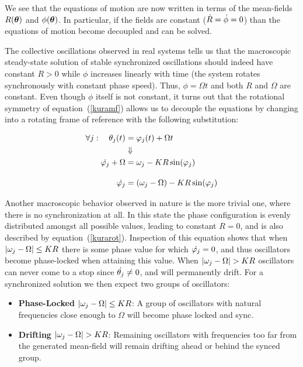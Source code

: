 We see that the equations of motion are now written in terms of the mean-fields $R(\bm{\theta})$ and $\phi(\bm{\theta})$. In
particular, if the fields are constant ($\dot{R} = \dot{\phi}=0$) than the equations of motion become decoupled and can be solved.

The collective oscillations observed in real systems tells us that the macroscopic steady-state solution of stable synchronized
oscillations should indeed have constant $R>0$ while $\phi$ increases linearly with time (the system rotates synchronously with
constant phase speed).  Thus, $\phi=\Omega t$ and both $R$ and $\Omega$ are constant. Even though $\phi$ itself is not constant, it
turns out that the rotational symmetry of equation~(\ref{kuramf}) allows us to decouple the equations by changing into a rotating frame
of reference with the following substitution:

\begin{align}
    \forall j: \quad \theta_j(t) &= \varphi_j(t) + \Omega t \notag\\
    &\Downarrow \notag\\
    \dot{\varphi_j} + \Omega &= \omega_j - K R \sin ( \varphi_j ) \notag\\[10pt]
    \dot{\varphi_j} &= (\omega_j-\Omega) - K R \sin ( \varphi_j )
    \label{kurarot}
\end{align}

Another macroscopic behavior observed in nature is the more trivial one, where there is no synchronization at all. In this state the
phase configuration is evenly distributed amongst all possible values, leading to constant $R=0$, and is also described by
equation~(\ref{kurarot}). Inspection of this equation shows that when $|\omega_j - \Omega| \leq K R$ there is some phase value for
which $\dot{\varphi_j}=0$, and thus oscillators become phase-locked when attaining this value. When $|\omega_j - \Omega| > K R$
oscillators can never come to a stop since $\dot{\theta_j} \neq 0$, and will permanently drift. For a synchronized solution we then
expect two groups of oscillators:

\begin{itemize}
    \item \textbf{Phase-Locked} $|\omega_j - \Omega|\leq K R$: A group of oscillators with natural frequencies close enough to
        $\Omega$ will become phase locked and sync.
    \item \textbf{Drifting} $|\omega_j - \Omega| > K R$: Remaining oscillators with frequencies too far from the generated mean-field
        will remain drifting ahead or behind the synced group.
\end{itemize}

